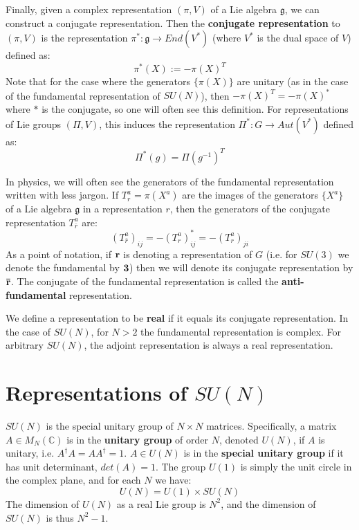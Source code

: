\documentclass[11pt, oneside]{article}   	%
\theoremstyle{definition}
\begin{document}
Finally, given a complex representation $(\pi, V)$ of a Lie algebra $\mathfrak g$, we can construct a conjugate representation. 
Then the \textbf{conjugate representation} to $(\pi, V)$ is the representation $\pi^* : \mathfrak g\rightarrow End(V^*)$ (where 
$V^*$ is the dual space of $V$) defined as:
\begin{equation}
	\pi^*(X) := -\pi(X)^T
\end{equation}
Note that for the case where the generators $\{\pi(X)\}$ are unitary (as in the case of the fundamental representation of 
$SU(N)$), then $-\pi(X)^T = -\pi(X)^*$ where $*$ is the conjugate, so one will often see this definition. For representations of 
Lie groups $(\Pi, V)$, this induces the representation $\Pi^* : G\rightarrow Aut(V^*)$ defined as:
\begin{equation}
	\Pi^*(g) = \Pi(g^{-1})^T
\end{equation}

In physics, we will often see the generators of the fundamental representation written with less jargon. If $T^a_r = \pi(X^a)$ 
are the images of the generators $\{X^a\}$ of a Lie algebra $\mathfrak g$ in a representation $r$, then the generators of the 
conjugate representation $T^a_{\bar r}$ are:
\begin{equation}
	(T^a_{\bar r})_{ij} = - (T^a_r)^*_{ij} = -(T^a_r)_{ji}
\end{equation}
As a point of notation, if $\bf{r}$ is denoting a representation of $G$ (i.e. for $SU(3)$ we denote the fundamental by $\bf{3}$) 
then we will denote its conjugate representation by $\bf{\bar r}$. The conjugate of the fundamental representation is called the 
\textbf{anti-fundamental} representation. 

We define a representation to be \textbf{real} if it equals its conjugate representation. In the case of $SU(N)$, for $N > 2$ the 
fundamental representation is complex. For arbitrary $SU(N)$, the adjoint representation is always a real representation. 

\label{sec:su_n}
\section{Representations of $SU(N)$}

$SU(N)$ is the special unitary group of $N\times N$ matrices. Specifically, a matrix $A\in M_{N}(\mathbb C)$ is 
in the \textbf{unitary group} of order $N$, denoted $U(N)$, if $A$ is unitary, i.e. $A^\dagger A = AA^\dagger = 1$. 
$A\in U(N)$ is in the \textbf{special unitary group} if it has unit determinant, $det(A) = 1$. The group $U(1)$ is 
simply the unit circle in the complex plane, and for each $N$ we have:
\begin{equation}
	U(N) = U(1)\times SU(N)
\end{equation}
The dimension of $U(N)$ as a real Lie group is $N^2$, and the dimension of $SU(N)$ is thus $N^2 - 1$. 
\end{document}
